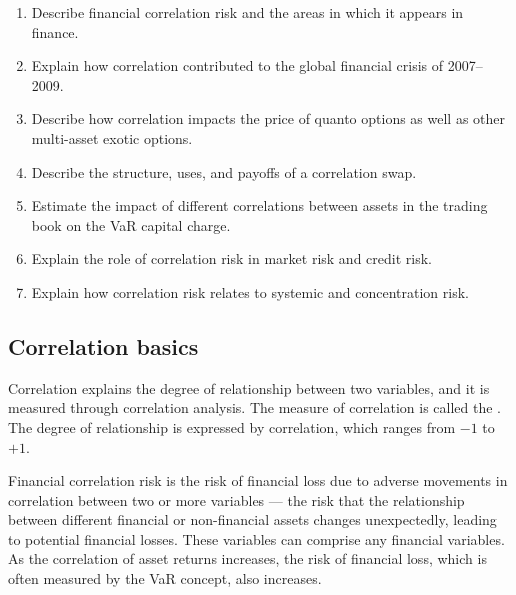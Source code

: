 
\begin{mrkeybox}[title={Learning objectives in this reading}]
\small
\begin{enumerate}[label=\textbf{\alph*.},leftmargin=1.7em]
\item Describe financial correlation risk and the areas in which it appears in finance.
\item Explain how correlation contributed to the global financial crisis of 2007--2009.
\item Describe how correlation impacts the price of quanto options as well as other multi-asset
      exotic options.
\item Describe the structure, uses, and payoffs of a correlation swap.
\item Estimate the impact of different correlations between assets in the trading book on the
      VaR capital charge.
\item Explain the role of correlation risk in market risk and credit risk.
\item Explain how correlation risk relates to systemic and concentration risk.
\end{enumerate}
\end{mrkeybox}


\subsection{Correlation basics}
Correlation explains the degree of relationship between two variables, and it is measured
through correlation analysis. The measure of correlation is called the . The degree of relationship is expressed by correlation, which ranges from $-1$ to
$+1$.

\begin{mrdefbox}[title={Financial correlation risk}]
Financial correlation risk is the risk of financial loss due to adverse movements in correlation
between two or more variables --- the risk that the relationship between different financial or
non-financial assets changes unexpectedly, leading to potential financial losses. These
variables can comprise any financial variables. As the correlation of asset returns increases,
the risk of financial loss, which is often measured by the VaR concept, also increases.
\end{mrdefbox}

